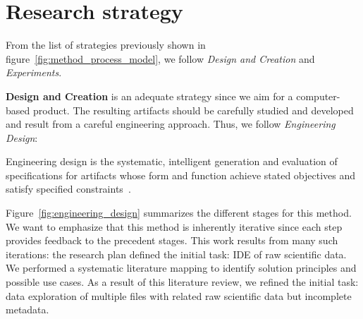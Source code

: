 \section{Research strategy}
\label{sec:method_strategy}
From the list of strategies previously shown in figure~\ref{fig:method_process_model},
we follow \emph{Design and Creation} and \emph{Experiments}.

\textbf{Design and Creation} is an adequate strategy since we aim for a
computer-based product. The resulting artifacts should be carefully studied and developed and result from a careful engineering approach.
Thus, we follow \emph{Engineering Design}:
    
\begin{displayquote}
  Engineering design is the systematic, intelligent generation and evaluation
  of specifications for artifacts whose form and function achieve stated
  objectives and satisfy specified constraints~\cite{Dym2012}.
\end{displayquote}

Figure~\ref{fig:engineering_design} summarizes the different stages for this method.
We want to emphasize that this method is inherently iterative since each step
provides feedback to the precedent stages. This work results from many such
iterations: the research plan defined the initial task: \gls{IDE} of raw scientific data.
We performed a systematic literature mapping to identify solution principles and possible use cases.
As a result of this literature review, we refined the initial task: data exploration of multiple files with related raw scientific data but incomplete metadata.


